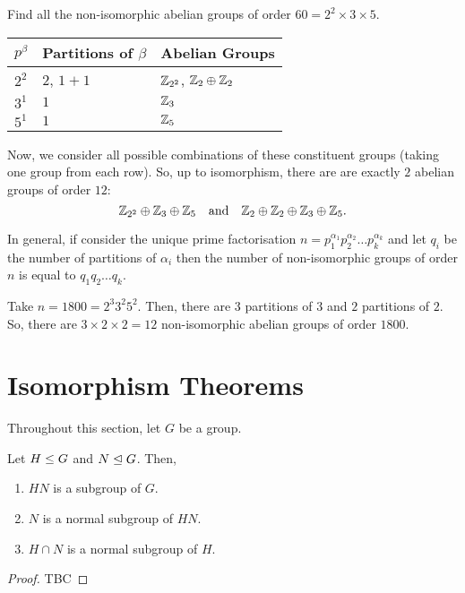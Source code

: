 \documentclass[11pt]{penrose}
\begin{document}
\begin{negg}
    Find all the non-isomorphic abelian groups of order $60 = 2^{2} \times 3 \times 5$.
    \begin{center}
        \begin{tabularx}{0.66\textwidth}{p{8mm}XX}
            \toprule
            $p^{\beta}$ & Partitions of $\beta$ & Abelian Groups\\
            \midrule
            $2^{2}$ & $2$, $1+1$ & $\mathbb{Z}_{2^{2}}$, $\mathbb{Z}_{2} \oplus \mathbb{Z}_{2}$ \\
            $3^{1}$ & $1$        & $\mathbb{Z}_{3}$ \\
            $5^{1}$ & $1$        & $\mathbb{Z}_{5}$ \\
            \bottomrule
        \end{tabularx}
    \end{center}
    Now, we consider all possible combinations of these constituent groups (taking one group from each row). So, up to isomorphism, there are are exactly $2$ abelian groups of order $12$:
    \begin{equation*}
        \mathbb{Z}_{2^{2}} \oplus \mathbb{Z}_{3} \oplus \mathbb{Z}_{5}
        \quad\text{and}\quad 
        \mathbb{Z}_{2} \oplus \mathbb{Z}_{2} \oplus \mathbb{Z}_{3} \oplus \mathbb{Z}_{5}.
    \end{equation*}
\end{negg}

In general, if consider the unique prime factorisation $n = p_{1}^{\alpha_{1}} p_{2}^{\alpha_{2}} \dots p_{k}^{\alpha_{k}}$ and let $q_{i}$ be the number of partitions of $\alpha_{i}$ then the number of non-isomorphic groups of order $n$ is equal to $q_{1} q_{2} \dots q_{k}$.

\begin{negg}
    Take $n = 1800 = 2^{3} 3^{2} 5^{2}$. Then, there are $3$ partitions of $3$ and $2$ partitions of $2$. So, there are $3 \times 2 \times 2 = 12$ non-isomorphic abelian groups of order $1800$.
\end{negg}


\section{Isomorphism Theorems}

Throughout this section, let $G$ be a group.

\begin{nlemma}
    Let $H \mathrel{\leq} G$ and $N \mathrel{\trianglelefteq} G$. Then,
    \begin{enumerate}
        \item $HN$ is a subgroup of $G$.
        \item $N$ is a normal subgroup of $HN$.
        \item $H \cap N$ is a normal subgroup of $H$.
    \end{enumerate}
\end{nlemma}
\begin{proof}
    TBC
\end{proof}
\end{document}
